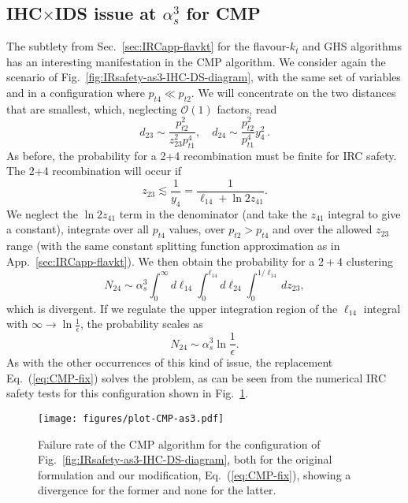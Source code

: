 \documentclass[nofootinbib,twocolumn,preprintnumbers,superscriptaddress,aps]{revtex4-2}
\newcommand{\as}{\alpha_s}
\begin{document}
\subsection{IHC$\times$IDS issue at $\as^3$ for CMP}
\label{sec:CMP-IHC-DS}

The subtlety from Sec.~\ref{sec:IRCapp-flavkt} for the flavour-$k_t$
and GHS algorithms has an interesting manifestation in the CMP
algorithm. 
%
% 
We consider again the scenario of
Fig.~\ref{fig:IRsafety-as3-IHC-DS-diagram}, with the same set of
variables and in a configuration where $p_{t4}\ll p_{t2}$.
%
We will concentrate on the two distances that are smallest, which,
neglecting $\mathcal O(1)$ factors, read
\begin{equation}
  d_{23} \sim \frac{p_{t2}^2}{z_{23}^2 p_{t1}^4},
  \quad
  d_{24} \sim \frac{p_{t2}^2}{p_{t1}^4} y_4^2\,.
\end{equation}
As before, the probability for a 2+4 recombination must be finite
for IRC safety. The 2+4 recombination will occur if
\begin{equation}
  z_{23}\lesssim \frac{1}{y_4} = \frac{1}{\ell_{14} + \ln 2z_{41}}.
\end{equation}
We neglect the $\ln 2z_{41}$ term in the denominator (and take the
$z_{41}$ integral to give a constant), integrate over all $p_{t4}$
values, over $p_{t2} > p_{t4}$ and over the allowed $z_{23}$ range
(with the same constant splitting function approximation as in
App.~\ref{sec:IRCapp-flavkt}).
%
We then obtain the probability for a $2+4$ clustering 
\begin{equation}
  N_{24} \sim \as^3\int_0^\infty d\ell_{14}\int_0^{\ell_{14}}
  d\ell_{24}
  \int_0^{1/\ell_{14}} d z_{23},
\end{equation}
which is divergent. If we regulate the upper integration region of the
$\ell_{14}$ integral with $\infty \to \ln \frac{1}{\epsilon}$, the
probability scales as
\begin{equation}
  N_{24} \sim \as^3 \ln\frac{1}{\epsilon}.
  \label{eq:CMP-as3-divergence}
\end{equation}
As with the other occurrences of this kind of issue, the replacement
Eq.~(\ref{eq:CMP-fix}) solves the problem, as can be seen from the numerical IRC
safety tests for this configuration shown in
Fig.~\ref{fig:CMP-IHC-DS-rate}.

\begin{figure}
  \centering
  \texttt{[image: figures/plot-CMP-as3.pdf]}
  \caption{Failure rate of the CMP algorithm for the configuration of
    Fig.~\ref{fig:IRsafety-as3-IHC-DS-diagram}, both for the original
    formulation and our modification, Eq.~(\ref{eq:CMP-fix}), showing
    a divergence for the former and none for the latter.}
  \label{fig:CMP-IHC-DS-rate}
\end{figure}
\end{document}
